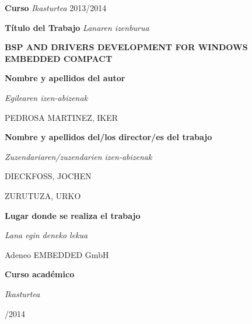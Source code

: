 \documentclass[a4paper,openright,12pt]{report}
\begin{document}
\begin{titlepage}
\begin{framed}
\noindent \textbf{Curso} \textit{Ikasturtea} \hspace{2.25cm}2013/2014						%

\end{framed}

\cleardoublepage

\thispagestyle{empty}

\begin{framed}
\begin{center}

\textbf{T\'itulo del Trabajo} \textit{Lanaren izenburua}

\vspace{1cm}

\textbf{BSP AND DRIVERS DEVELOPMENT FOR WINDOWS EMBEDDED COMPACT}			%

\end{center}
\end{framed}

\noindent \textbf{Nombre y apellidos del autor}

\noindent \textit{Egilearen izen-abizenak}

\noindent PEDROSA MARTINEZ, IKER													%

\vspace{0.5cm}

\noindent \textbf{Nombre y apellidos del/los director/es del trabajo}

\noindent \textit{Zuzendariaren/zuzendarien izen-abizenak}

\noindent DIECKFOSS, JOCHEN														%

\noindent ZURUTUZA, URKO															%

\vspace{0.5cm}

\noindent \textbf{Lugar donde se realiza el trabajo}

\noindent \textit{Lana egin deneko lekua}

\noindent Adeneo EMBEDDED GmbH													%

\vspace{0.5cm}

\noindent \textbf{Curso acad\'emico}

\noindent \textit{Ikasturtea}

/2014																%

\vspace{1.5cm}


\end{titlepage}
\end{document}
